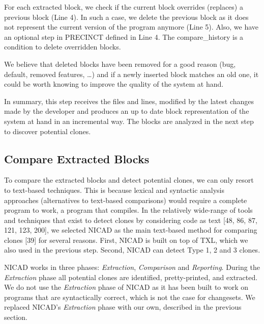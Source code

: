 \documentclass[12pt]{report}
\begin{document}
For each extracted block, we check if the current block overrides
(replaces) a previous block (Line 4). In such a case, we delete the
previous block as it does not represent the current version of the
program anymore (Line 5). Also, we have an optional step in PRECINCT
defined in Line 4. The compare\_history is a condition to delete
overridden blocks.

We believe that deleted blocks have been removed for a good reason (bug,
default, removed features, \ldots{}) and if a newly inserted block
matches an old one, it could be worth knowing to improve the quality of
the system at hand.

In summary, this step receives the files and lines, modified by the
latest changes made by the developer and produces an up to date block
representation of the system at hand in an incremental way. The blocks
are analyzed in the next step to discover potential clones.



\subsection{Compare Extracted Blocks}\label{compare-extracted-blocks}

To compare the extracted blocks and detect potential clones, we can only
resort to text-based techniques. This is because lexical and syntactic
analysis approaches (alternatives to text-based comparisons) would
require a complete program to work, a program that compiles. In the
relatively wide-range of tools and techniques that exist to detect
clones by considering code as text {[}48, 86, 87, 121, 123, 200{]}, we
selected NICAD as the main text-based method for comparing clones
{[}39{]} for several reasons. First, NICAD is built on top of TXL, which
we also used in the previous step. Second, NICAD can detect Type 1, 2
and 3 clones.

NICAD works in three phases: \emph{Extraction}, \emph{Comparison} and
\emph{Reporting}. During the \emph{Extraction} phase all potential
clones are identified, pretty-printed, and extracted. We do not use the
\emph{Extraction} phase of NICAD as it has been built to work on
programs that are syntactically correct, which is not the case for
changesets. We replaced NICAD's \emph{Extraction} phase with our own,
described in the previous section.
\end{document}
